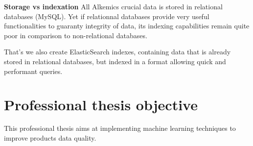 \textbf{Storage vs indexation}
All Alkemics crucial data is stored in relational databases (MySQL). Yet if relationnal databases provide very useful functionalities to guaranty integrity of data, its indexing capabilities remain quite poor in comparison to non-relational databases.

That's we also create ElasticSearch indexes, containing data that is already stored in relational databases, but indexed in a format allowing quick and performant queries.


\section{Professional thesis objective}

This professional thesis aims at implementing machine learning techniques to improve products data quality.
